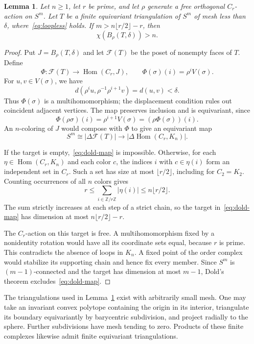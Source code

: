 \documentclass[11pt]{amsart}
\newtheorem{lemma}[theorem]{Lemma}
\theoremstyle{definition}
\theoremstyle{remark}
\numberwithin{equation}{section}
\newcommand{\Z}{\mathbb Z}
\newcommand{\Hom}{\operatorname{Hom}}
\begin{document}
\begin{lemma}\label{lem:finite-lower}
Let $n\geq1$, let $r$ be prime, and let $\rho$ generate a free orthogonal $C_r$-action on $S^m$. Let $T$ be a finite equivariant triangulation of $S^m$ of mesh less than $\delta$, where~\eqref{eq:loopless} holds. If $m>n\lfloor r/2\rfloor-r$, then
\[
 \chi(B_\rho(T,\delta))>n.
\]
\end{lemma}
\begin{proof}
Put $J=B_\rho(T,\delta)$ and let $\mathcal F(T)$ be the poset of nonempty faces of $T$. Define
\[
 \Phi:\mathcal F(T)\longrightarrow\Hom(C_r,J),
 \qquad \Phi(\sigma)(i)=\rho^iV(\sigma).
\]
For $u,v\in V(\sigma)$, we have
\[
 d(\rho^iu,\rho^{-1}\rho^{i+1}v)=d(u,v)<\delta.
\]
Thus $\Phi(\sigma)$ is a multihomomorphism; the displacement condition rules out coincident adjacent vertices. The map preserves inclusion and is equivariant, since
\[
 \Phi(\rho\sigma)(i)=\rho^{i+1}V(\sigma)
 =(\rho\Phi(\sigma))(i).
\]
An $n$-coloring of $J$ would compose with $\Phi$ to give an equivariant map
\begin{equation}\label{eq:dold-map}
 S^m\cong|\Delta\mathcal F(T)|
 \longrightarrow |\Delta\Hom(C_r,K_n)|.
\end{equation}

If the target is empty,~\eqref{eq:dold-map} is impossible. Otherwise, for each $\eta\in\Hom(C_r,K_n)$ and each color $c$, the indices $i$ with $c\in\eta(i)$ form an independent set in $C_r$. Such a set has size at most $\lfloor r/2\rfloor$, including for $C_2=K_2$. Counting occurrences of all $n$ colors gives
\[
 r\leq \sum_{i\in\Z/r\Z}|\eta(i)|\leq n\lfloor r/2\rfloor .
\]
The sum strictly increases at each step of a strict chain, so the target in~\eqref{eq:dold-map} has dimension at most $n\lfloor r/2\rfloor-r$.

The $C_r$-action on this target is free. A multihomomorphism fixed by a nonidentity rotation would have all its coordinate sets equal, because $r$ is prime. This contradicts the absence of loops in $K_n$. A fixed point of the order complex would stabilize its supporting chain and hence fix every member. Since $S^m$ is $(m-1)$-connected and the target has dimension at most $m-1$, Dold's theorem excludes~\eqref{eq:dold-map}.
\end{proof}

The triangulations used in Lemma~\ref{lem:finite-lower} exist with arbitrarily small mesh. One may take an invariant convex polytope containing the origin in its interior, triangulate its boundary equivariantly by barycentric subdivision, and project radially to the sphere. Further subdivisions have mesh tending to zero. Products of these finite complexes likewise admit finite equivariant triangulations.
\end{document}
